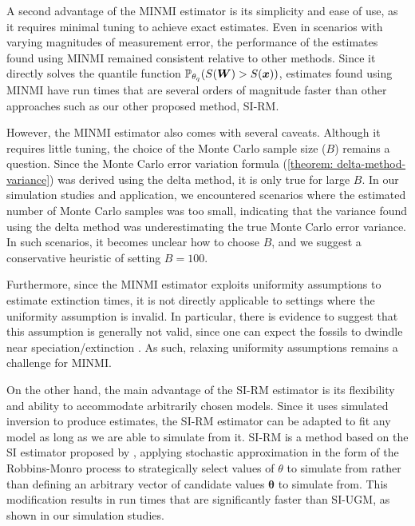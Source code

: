 A second advantage of the MINMI estimator is its simplicity and ease of use, as it requires minimal tuning to achieve exact estimates. Even in scenarios with varying magnitudes of measurement error, the performance of the estimates found using MINMI remained consistent relative to other methods. Since it directly solves the quantile function $\mathbb{P}_{\theta_q}(S(\bm{W}) > S(\bm{x}))$, estimates found using MINMI have run times that are several orders of magnitude faster than other approaches such as our other proposed method, SI-RM.

However, the MINMI estimator also comes with several caveats. Although it requires little tuning, the choice of the Monte Carlo sample size ($B$) remains a question. Since the Monte Carlo error variation formula (\autoref{theorem: delta-method-variance}) was derived using the delta method, it is only true for large $B$. In our simulation studies and application, we encountered scenarios where the estimated number of Monte Carlo samples was too small, indicating that the variance found using the delta method was underestimating the true Monte Carlo error variance. In such scenarios, it becomes unclear how to choose $B$, and we suggest a conservative heuristic of setting $B=100$.

Furthermore, since the MINMI estimator exploits uniformity assumptions to estimate extinction times, it is not directly applicable to settings where the uniformity assumption is invalid. In particular, there is evidence to suggest that this assumption is generally not valid, since one can expect the fossils to dwindle near speciation/extinction \cite{Lee2010, Signor1982, WangMarshall2016}. As such, relaxing uniformity assumptions remains a challenge for MINMI.

On the other hand, the main advantage of the SI-RM estimator is its flexibility and ability to accommodate arbitrarily chosen models. Since it uses simulated inversion to produce estimates, the SI-RM estimator can be adapted to fit any model as long as we are able to simulate from it. SI-RM is a method based on the SI estimator proposed by \citet{Huang2019}, applying stochastic approximation in the form of the Robbins-Monro process to strategically select values of $\theta$ to simulate from rather than defining an arbitrary vector of candidate values $\bm{\theta}$ to simulate from. This modification results in run times that are significantly faster than SI-UGM, as shown in our simulation studies.

